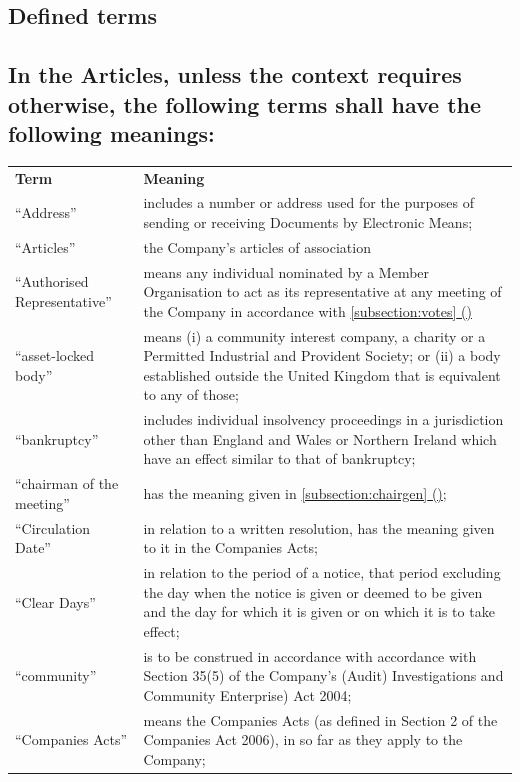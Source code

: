 \documentclass[12pt]{article}
\newcommand*{\fancyref}[1]{\hyperref[{#1}]{\autoref*{#1} (\nameref*{#1})}}
\begin{document}
\subsection*{Defined terms}
\subsection[Meanings of Defined Terms]{\mdseries\normalsize{In the Articles, unless the context requires otherwise, the following terms shall have the following meanings:}}

\begin{longtable}[p]{ p{1.5in} p{30em} }
{\bfseries{Term}} & {\bfseries{Meaning}} \\
  ``Address'' & includes a number or address used for the purposes of sending or receiving Documents by Electronic Means; \\
  ``Articles'' & the Company's articles of association \\
  ``Authorised Representative'' & means any individual nominated by a Member Organisation to act as its representative at any meeting of the Company in accordance with \fancyref{subsection:votes} \\
  ``asset-locked body'' & means (i) a community interest company, a charity  or a Permitted Industrial and Provident Society; or (ii) a body established outside the United Kingdom that is equivalent to any of those; \\
  ``bankruptcy'' & includes individual insolvency proceedings in a jurisdiction other than England and Wales or Northern Ireland which have an effect similar to that of bankruptcy; \\
  ``chairman of the meeting'' & has the meaning given in \fancyref{subsection:chairgen}; \\
  ``Circulation Date'' & in relation to a written resolution, has the meaning given to it in the Companies Acts; \\
  ``Clear Days'' & in relation to the period of a notice, that period excluding the day when the notice is given or deemed to be given and the day for which it is given or on which it is to take effect; \\
  ``community'' & is to be construed in accordance with accordance with Section 35(5) of the Company’s (Audit) Investigations and Community Enterprise) Act 2004; \\
  ``Companies Acts'' & means the Companies Acts (as defined in Section 2 of the Companies Act 2006), in so far as they apply to the Company; \\

\end{longtable}
\end{document}
